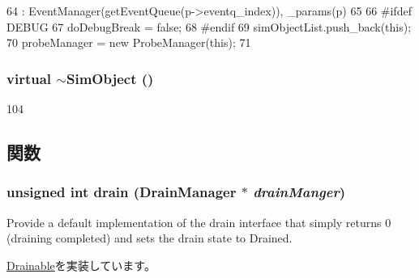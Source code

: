 \begin{DoxyCode}
64     : EventManager(getEventQueue(p->eventq_index)), _params(p)
65 {
66 #ifdef DEBUG
67     doDebugBreak = false;
68 #endif
69     simObjectList.push_back(this);
70     probeManager = new ProbeManager(this);
71 }
\end{DoxyCode}
\hypertarget{classSimObject_a8a5c5109a2eb74056734bb8795eca530}{
\subsubsection[{$\sim$SimObject}]{\setlength{\rightskip}{0pt plus 5cm}virtual $\sim${\bf SimObject} ()}}
\label{classSimObject_a8a5c5109a2eb74056734bb8795eca530}



\begin{DoxyCode}
104 {}
\end{DoxyCode}


\subsection{関数}
\hypertarget{classSimObject_a6bf479c521c7c3eb473822d953275b26}{
\subsubsection[{drain}]{\setlength{\rightskip}{0pt plus 5cm}unsigned int drain ({\bf DrainManager} $\ast$ {\em drainManger})}}
\label{classSimObject_a6bf479c521c7c3eb473822d953275b26}
Provide a default implementation of the drain interface that simply returns 0 (draining completed) and sets the drain state to Drained. 

\hyperlink{classDrainable_a1ed42c14f2f622ea6b0df3865e89c8b4}{Drainable}を実装しています。

